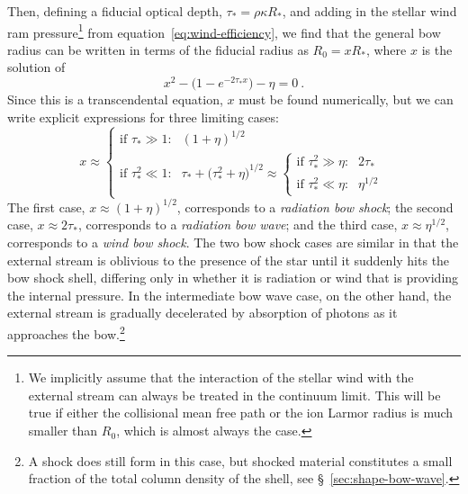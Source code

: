 Then, defining a fiducial optical depth, \(\tau_* = \rho \kappa R_*\), and adding
in the stellar wind ram pressure\footnote{%
  We implicitly assume that the interaction of the stellar wind with
  the external stream can always be treated in the continuum limit.
  This will be true if either the collisional mean free path or the
  ion Larmor radius is much smaller than \(R_0\), which is almost
  always the case.} %
from equation~\eqref{eq:wind-efficiency}, we find that the general bow
radius can be written in terms of the fiducial radius as
\(R_0 = x R_*\), where \(x\) is the solution of
\begin{equation}
  \label{eq:rad-full-x}
  x^2 - \bigl(1 - e^{-2 \tau_* x} \bigr) - \eta = 0 \ .
\end{equation}
Since this is a transcendental equation, \(x\) must be found
numerically, but we can write explicit expressions for three limiting
cases:
\begin{equation}
  \label{eq:x-cases}
  x \approx
  \begin{cases}
    \text{if \(\tau_* \gg 1\):} & (1 + \eta)^{1/2} \\
    \text{if \(\tau_*^2 \ll 1\):} & \tau_* + \bigl( \tau_*^2 + \eta \bigr)^{1/2} \approx
    \begin{cases}
      \text{if \(\tau_*^2 \gg \eta\):} & 2 \tau_* \\
      \text{if \(\tau_*^2 \ll \eta\):} & \eta^{1/2} 
    \end{cases}
  \end{cases}
\end{equation}
The first case, \(x \approx (1 + \eta)^{1/2}\), corresponds to a
\textit{radiation bow shock}; the second case,
\(x \approx 2 \tau_* \), corresponds to a \textit{radiation bow wave}; and the
third case, \(x \approx \eta^{1/2}\), corresponds to a \textit{wind bow shock}.
The two bow shock cases are similar in that the external stream is
oblivious to the presence of the star until it suddenly hits the bow
shock shell, differing only in whether it is radiation or wind that is
providing the internal pressure.  In the intermediate bow wave case,
on the other hand, the external stream is gradually decelerated by
absorption of photons as it approaches the bow.\footnote{A shock does
  still form in this case, but shocked material constitutes a small
  fraction of the total column density of the shell, see
  \S~\ref{sec:shape-bow-wave}.}

